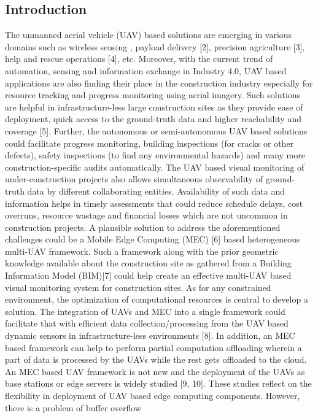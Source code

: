 \documentclass{article}
\begin{document}
\begin{multicols}{2}
\section{Introduction}
The unmanned aerial vehicle (UAV) based solutions are
emerging in various domains such as wireless sensing \cite{mozaffari2019tutorial},
payload delivery [2], precision agriculture [3], help and
rescue operations [4], etc. Moreover, with the current
trend of automation, sensing and information exchange in Industry 4.0, UAV based applications are also finding
their place in the construction industry especially for resource
tracking and progress monitoring using aerial imagery.
Such solutions are helpful in infrastructure-less
large construction sites as they provide ease of deployment,
quick access to the ground-truth data and higher
reachability and coverage [5]. Further, the autonomous
or semi-autonomous UAV based solutions could facilitate
progress monitoring, building inspections (for cracks or
other defects), safety inspections (to find any environmental
hazards) and many more construction-specific audits
automatically. The UAV based visual monitoring of
under-construction projects also allows simultaneous observability
of ground-truth data by different collaborating
entities. Availability of such data and information helps
in timely assessments that could reduce schedule delays,
cost overruns, resource wastage and financial losses which
are not uncommon in construction projects.
A plausible solution to address the aforementioned
challenges could be a Mobile Edge Computing (MEC)
[6] based heterogeneous multi-UAV framework. Such a
framework along with the prior geometric knowledge available
about the construction site as gathered from a Building
Information Model (BIM)[7] could help create an effective
multi-UAV based visual monitoring system for construction
sites. As for any constrained environment, the
optimization of computational resources is central to develop
a solution. The integration of UAVs and MEC into
a single framework could facilitate that with efficient data
collection/processing from the UAV based dynamic sensors
in infrastructure-less environments [8]. In addition,
an MEC based framework can help to perform partial
computation offloading wherein a part of data is processed
by the UAVs while the rest gets offloaded to the cloud.
An MEC based UAV framework is not new and the deployment
of the UAVs as base stations or edge servers
is widely studied [9, 10]. These studies reflect on the flexibility in deployment of UAV based edge computing
components. However, there is a problem of buffer overflow

\end{multicols}
\end{document}
